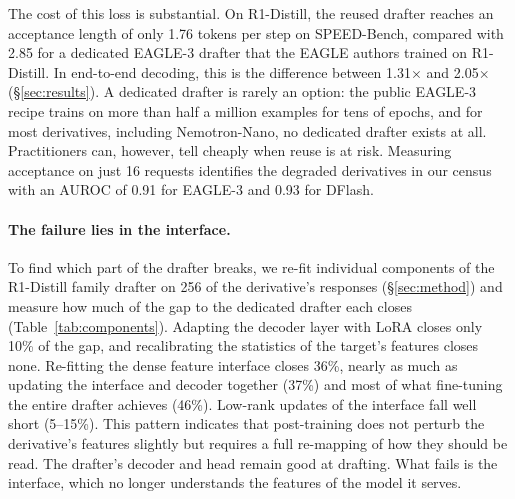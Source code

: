 \documentclass[11pt]{article}
\begin{document}
The cost of this loss is substantial.
On R1-Distill, the reused drafter reaches an acceptance length of only 1.76 tokens per step on SPEED-Bench, compared with 2.85 for a dedicated EAGLE-3 drafter that the EAGLE authors trained on R1-Distill.
In end-to-end decoding, this is the difference between 1.31$\times$ and 2.05$\times$ (\S\ref{sec:results}).
A dedicated drafter is rarely an option: the public EAGLE-3 recipe trains on more than half a million examples for tens of epochs, and for most derivatives, including Nemotron-Nano, no dedicated drafter exists at all.
Practitioners can, however, tell cheaply when reuse is at risk.
Measuring acceptance on just 16 requests identifies the degraded derivatives in our census with an AUROC of 0.91 for EAGLE-3 and 0.93 for DFlash.

\paragraph{The failure lies in the interface.}
To find which part of the drafter breaks, we re-fit individual components of the R1-Distill family drafter on 256 of the derivative's responses (\S\ref{sec:method}) and measure how much of the gap to the dedicated drafter each closes (Table~\ref{tab:components}).
Adapting the decoder layer with LoRA \citep{hu2022lora} closes only 10\% of the gap, and recalibrating the statistics of the target's features closes none.
Re-fitting the dense feature interface closes 36\%, nearly as much as updating the interface and decoder together (37\%) and most of what fine-tuning the entire drafter achieves (46\%).
Low-rank updates of the interface fall well short (5--15\%).
This pattern indicates that post-training does not perturb the derivative's features slightly but requires a full re-mapping of how they should be read.
The drafter's decoder and head remain good at drafting.
What fails is the interface, which no longer understands the features of the model it serves.
\end{document}
